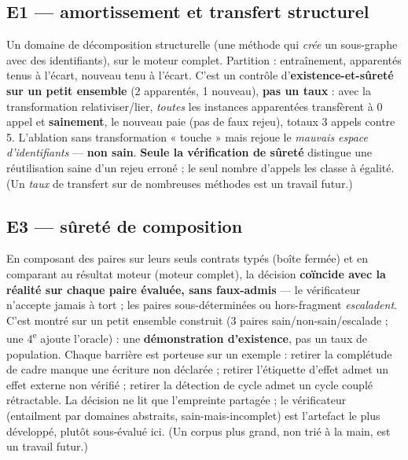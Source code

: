 \documentclass[11pt]{article}
\begin{document}
\subsection{E1 --- amortissement et transfert structurel}
Un domaine de décomposition structurelle (une méthode qui \emph{crée} un sous-graphe avec des identifiants), sur le
moteur complet. Partition : entraînement, apparentés tenus à l'écart, nouveau tenu à l'écart. C'est un contrôle
d'\textbf{existence-et-sûreté sur un petit ensemble} (2 apparentés, 1 nouveau), \textbf{pas un taux} : avec la
transformation relativiser/lier, \emph{toutes} les instances apparentées transfèrent à 0 appel et \textbf{sainement},
le nouveau paie (pas de faux rejeu), totaux 3 appels contre 5. L'ablation sans transformation « touche » mais
rejoue le \emph{mauvais espace d'identifiants} --- \textbf{non sain}. \textbf{Seule la vérification de sûreté}
distingue une réutilisation saine d'un rejeu erroné ; le seul nombre d'appels les classe à égalité. (Un \emph{taux}
de transfert sur de nombreuses méthodes est un travail futur.)

\subsection{E3 --- sûreté de composition}\label{sec:e3}
En composant des paires sur leurs seuls contrats typés (boîte fermée) et en comparant au résultat moteur (moteur
complet), la décision \textbf{coïncide avec la réalité sur chaque paire évaluée, sans faux-admis} --- le
vérificateur n'accepte jamais à tort ; les paires sous-déterminées ou hors-fragment \emph{escaladent}. C'est montré
sur un petit ensemble construit (3 paires sain/non-sain/escalade ; une 4\textsuperscript{e} ajoute l'oracle) : une
\textbf{démonstration d'existence}, pas un taux de population. Chaque barrière est porteuse sur un exemple :
retirer la complétude de cadre manque une écriture non déclarée ; retirer l'étiquette d'effet admet un effet
externe non vérifié ; retirer la détection de cycle admet un cycle couplé rétractable. La décision ne lit que
l'empreinte partagée ; le vérificateur (entailment par domaines abstraits, sain-mais-incomplet) est l'artefact le
plus développé, plutôt sous-évalué ici. (Un corpus plus grand, non trié à la main, est un travail futur.)
\end{document}
